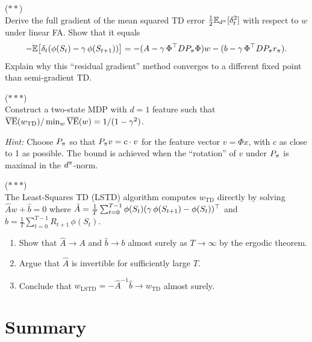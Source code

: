 \documentclass[11pt,a4paper]{article}
\begin{document}
\begin{exercise}
\textnormal{(\(**\))} \\
Derive the full gradient of the mean squared TD error
$\frac{1}{2}\mathbb{E}_{d^\pi}[\delta_t^2]$ with respect to $w$ under
linear FA. Show that it equals
\begin{equation*}
  -\mathbb{E}\bigl[\delta_t(\phi(S_t) - \gamma\,\phi(S_{t+1}))\bigr]
  = -(A - \gamma\, \Phi^\top D P_\pi \Phi) w
  - (b - \gamma\, \Phi^\top D P_\pi r_\pi).
\end{equation*}
Explain why this ``residual gradient'' method converges to a different
fixed point than semi-gradient TD.
\end{exercise}

\begin{exercise}
\textnormal{(\(***\))} \\
Construct a two-state MDP with $d = 1$ feature such that
$\overline{\mathrm{VE}}(w_{\mathrm{TD}})/\min_w
\overline{\mathrm{VE}}(w) = 1/(1-\gamma^2)$.

\textit{Hint:} Choose $P_\pi$ so that $P_\pi v = c \cdot v$
for the feature vector $v = \Phi x$, with $c$ as close to 1 as
possible. The bound is achieved when the ``rotation'' of $v$ under
$P_\pi$ is maximal in the $d^\pi$-norm.
\end{exercise}

\begin{exercise}
\textnormal{(\(***\))} \\
The Least-Squares TD (LSTD) algorithm computes $w_{\mathrm{TD}}$
directly by solving $\hat{A}w + \hat{b} = 0$ where
$\hat{A} = \frac{1}{T}\sum_{t=0}^{T-1} \phi(S_t)(\gamma\,
\phi(S_{t+1}) - \phi(S_t))^\top$ and
$\hat{b} = \frac{1}{T}\sum_{t=0}^{T-1} R_{t+1}\,\phi(S_t)$.
\begin{enumerate}[nosep]
  \item[(a)] Show that $\hat{A} \to A$ and $\hat{b} \to b$ almost
    surely as $T \to \infty$ by the ergodic theorem.
  \item[(b)] Argue that $\hat{A}$ is invertible for sufficiently
    large $T$.
  \item[(c)] Conclude that $w_{\mathrm{LSTD}} = -\hat{A}^{-1}\hat{b}
    \to w_{\mathrm{TD}}$ almost surely.
\end{enumerate}
\end{exercise}

\section{Summary}
\label{sec:summary}
\end{document}
